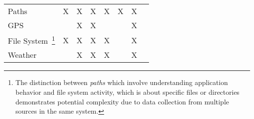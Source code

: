\begin{table}[tbph]
\begin{minipage}{\textwidth}
\begin{tabular}{p{3cm}ccccccl}
            \rowcolor[rgb]{ .851,  .851,  .851}
            Paths                                                        & X                                                     & X                                                                                          & X                                                       & X                                                                                          & X                                                     & X                                                                                         & \cite{vianna2019searching,provsearch}
            \tabularnewline

            GPS                                                          &                                                       & X                                                                                          & X                                                       &                                                                                            &                                                       & X                                                                                         & \cite{vianna2014a}
            \tabularnewline

            \rowcolor[rgb]{ .851,  .851,  .851}
            File System~\footnote{The distinction between \emph{paths} which
                involve understanding application behavior and file system activity,
                which is about specific files or directories demonstrates potential
                complexity due to data collection from multiple sources in the
            same system.}                                                & X
                                                                         & X
                                                                         & X                                                     & X
                                                                         &                                                       & X                                                                                          & \cite{vianna2014a,provsearch}
            \tabularnewline

            Weather                                                      &                                                       & X                                                                                          & X                                                       & X                                                                                          &                                                       & X                                                                                         & \cite{vianna2014a}
            \tabularnewline


\end{tabular}
\end{minipage}
\end{table}
